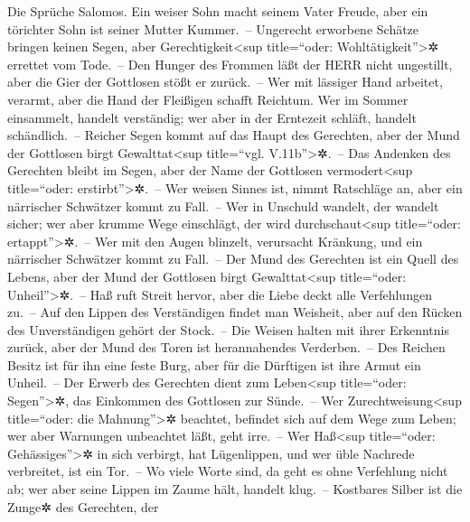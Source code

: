 Die Sprüche Salomos. Ein weiser Sohn macht seinem Vater
Freude, aber ein törichter Sohn ist seiner Mutter Kummer.~--
Ungerecht erworbene Schätze bringen keinen Segen, aber
Gerechtigkeit\textless sup title=``oder: Wohltätigkeit''\textgreater✲
errettet vom Tode.~-- Den Hunger des Frommen läßt der HERR
nicht ungestillt, aber die Gier der Gottlosen stößt er zurück.~--
Wer mit lässiger Hand arbeitet, verarmt, aber die Hand der
Fleißigen schafft Reichtum. Wer im Sommer einsammelt,
handelt verständig; wer aber in der Erntezeit schläft, handelt
schändlich.~-- Reicher Segen kommt auf das Haupt des
Gerechten, aber der Mund der Gottlosen birgt Gewalttat\textless sup
title=``vgl. V.11b''\textgreater✲.~-- Das Andenken des
Gerechten bleibt im Segen, aber der Name der Gottlosen
vermodert\textless sup title=``oder: erstirbt''\textgreater✲.~--
Wer weisen Sinnes ist, nimmt Ratschläge an, aber ein
närrischer Schwätzer kommt zu Fall.~-- Wer in Unschuld
wandelt, der wandelt sicher; wer aber krumme Wege einschlägt, der wird
durchschaut\textless sup title=``oder: ertappt''\textgreater✲.~--
Wer mit den Augen blinzelt, verursacht Kränkung, und ein
närrischer Schwätzer kommt zu Fall.~-- Der Mund des
Gerechten ist ein Quell des Lebens, aber der Mund der Gottlosen birgt
Gewalttat\textless sup title=``oder: Unheil''\textgreater✲.~--
Haß ruft Streit hervor, aber die Liebe deckt alle
Verfehlungen zu.~-- Auf den Lippen des Verständigen
findet man Weisheit, aber auf den Rücken des Unverständigen gehört der
Stock.~-- Die Weisen halten mit ihrer Erkenntnis zurück,
aber der Mund des Toren ist herannahendes Verderben.~--
Des Reichen Besitz ist für ihn eine feste Burg, aber für
die Dürftigen ist ihre Armut ein Unheil.~-- Der Erwerb
des Gerechten dient zum Leben\textless sup title=``oder:
Segen''\textgreater✲, das Einkommen des Gottlosen zur Sünde.~--
Wer Zurechtweisung\textless sup title=``oder: die
Mahnung''\textgreater✲ beachtet, befindet sich auf dem Wege zum Leben;
wer aber Warnungen unbeachtet läßt, geht irre.~-- Wer
Haß\textless sup title=``oder: Gehässiges''\textgreater✲ in sich
verbirgt, hat Lügenlippen, und wer üble Nachrede verbreitet, ist ein
Tor.~-- Wo viele Worte sind, da geht es ohne Verfehlung
nicht ab; wer aber seine Lippen im Zaume hält, handelt klug.~--
Kostbares Silber ist die Zunge✲ des Gerechten, der
